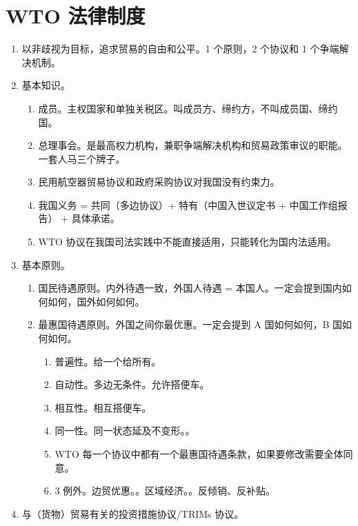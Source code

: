 \section{WTO 法律制度}
\begin{enumerate}
  \item 以非歧视为目标，追求贸易的自由和公平。1 个原则，2 个协议和 1 个争端解决机制。
  \item 基本知识。
        \begin{enumerate}
          \item 成员。主权国家和单独关税区。叫成员方、缔约方，不叫成员国、缔约国。
          \item 总理事会。是最高权力机构，兼职争端解决机构和贸易政策审议的职能。一套人马三个牌子。
          \item 民用航空器贸易协议和政府采购协议对我国没有约束力。
          \item 我国义务 = 共同（多边协议）+ 特有（中国入世议定书 + 中国工作组报告） + 具体承诺。
          \item WTO 协议在我国司法实践中不能直接适用，只能转化为国内法适用。
        \end{enumerate}
  \item 基本原则。
        \begin{enumerate}
          \item 国民待遇原则。内外待遇一致，外国人待遇 = 本国人。一定会提到国内如何如何，国外如何如何。
          \item 最惠国待遇原则。外国之间你最优惠。一定会提到 A 国如何如何，B 国如何如何。
                \begin{enumerate}
                  \item 普遍性。给一个给所有。
                  \item 自动性。多边无条件。允许搭便车。
                  \item 相互性。相互搭便车。
                  \item 同一性。同一状态延及不变形。。
                  \item WTO 每一个协议中都有一个最惠国待遇条款，如果要修改需要全体同意。
                  \item 3 例外。\yi 边贸优惠。。\er 区域经济。。\san 反倾销、反补贴。
                \end{enumerate}
        \end{enumerate}
  \item 与（货物）贸易有关的投资措施协议/TRIMs 协议。
        \begin{enumerate}

\end{enumerate}
\end{enumerate}

